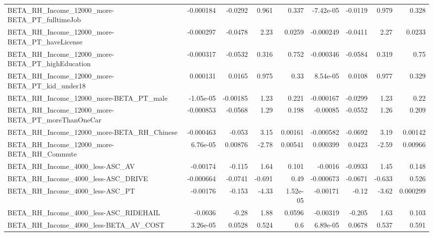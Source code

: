 \begin{tabular}{lrrrrrrrr}
BETA\_RH\_Income\_12000\_more-BETA\_PT\_fulltimeJob      &   -0.000184 &      -0.0292 &    0.961 &    0.337 &  -7.42e-05 &     -0.0119 &        0.979 &         0.328 \\
BETA\_RH\_Income\_12000\_more-BETA\_PT\_haveLicense      &   -0.000297 &      -0.0478 &     2.23 &   0.0259 &  -0.000249 &     -0.0411 &         2.27 &        0.0233 \\
BETA\_RH\_Income\_12000\_more-BETA\_PT\_highEducation    &   -0.000317 &      -0.0532 &    0.316 &    0.752 &  -0.000346 &     -0.0584 &        0.319 &          0.75 \\
BETA\_RH\_Income\_12000\_more-BETA\_PT\_kid\_under18      &    0.000131 &       0.0165 &    0.975 &     0.33 &   8.54e-05 &      0.0108 &        0.977 &         0.329 \\
BETA\_RH\_Income\_12000\_more-BETA\_PT\_male             &   -1.05e-05 &     -0.00185 &     1.23 &    0.221 &  -0.000167 &     -0.0299 &         1.23 &          0.22 \\
BETA\_RH\_Income\_12000\_more-BETA\_PT\_moreThanOneCar   &   -0.000853 &      -0.0568 &     1.29 &    0.198 &   -0.00085 &     -0.0552 &         1.26 &         0.209 \\
BETA\_RH\_Income\_12000\_more-BETA\_RH\_Chinese          &   -0.000463 &       -0.053 &     3.15 &  0.00161 &  -0.000582 &     -0.0692 &         3.19 &       0.00142 \\
BETA\_RH\_Income\_12000\_more-BETA\_RH\_Commute          &    6.76e-05 &      0.00876 &    -2.78 &  0.00541 &   0.000399 &      0.0423 &        -2.59 &       0.00966 \\
BETA\_RH\_Income\_4000\_less-ASC\_AV                    &    -0.00174 &       -0.115 &     1.64 &    0.101 &    -0.0016 &     -0.0933 &         1.45 &         0.148 \\
BETA\_RH\_Income\_4000\_less-ASC\_DRIVE                 &   -0.000664 &      -0.0741 &   -0.691 &     0.49 &  -0.000673 &     -0.0671 &       -0.633 &         0.526 \\
BETA\_RH\_Income\_4000\_less-ASC\_PT                    &    -0.00176 &       -0.153 &    -4.33 & 1.52e-05 &   -0.00171 &       -0.12 &        -3.62 &      0.000299 \\
BETA\_RH\_Income\_4000\_less-ASC\_RIDEHAIL              &     -0.0036 &        -0.28 &     1.88 &   0.0596 &   -0.00319 &      -0.205 &         1.63 &         0.103 \\
BETA\_RH\_Income\_4000\_less-BETA\_AV\_COST              &    3.26e-05 &       0.0528 &    0.524 &      0.6 &   6.89e-05 &      0.0678 &        0.537 &         0.591 \\

\end{tabular}
